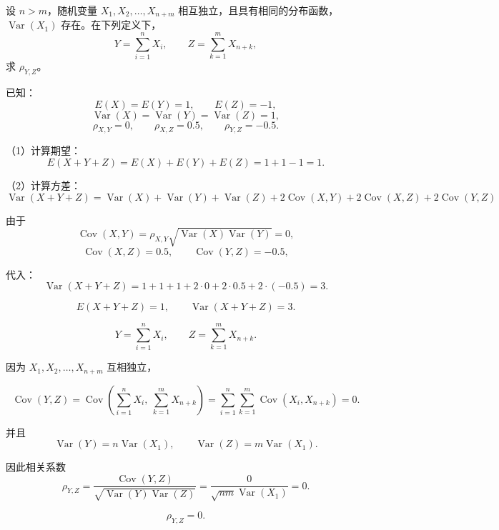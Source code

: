\begin{homework}[3.34]
设 $n > m$，随机变量 $X_1, X_2, \dots, X_{n+m}$ 相互独立，且具有相同的分布函数，$\operatorname{Var}(X_1)$ 存在。在下列定义下，
\[
Y = \sum_{i=1}^n X_i,\qquad Z = \sum_{k=1}^m X_{n+k},
\]
求 $\rho_{Y,Z}$。
\end{homework}
\begin{solution}
已知：
\[
E(X)=E(Y)=1,\qquad E(Z)=-1,
\]
\[
\operatorname{Var}(X)=\operatorname{Var}(Y)=\operatorname{Var}(Z)=1,
\]
\[
\rho_{X,Y}=0,\qquad \rho_{X,Z}=0.5,\qquad \rho_{Y,Z}=-0.5.
\]

（1）计算期望：
\[
E(X+Y+Z)=E(X)+E(Y)+E(Z)=1+1-1=1.
\]

（2）计算方差：
\[
\operatorname{Var}(X+Y+Z)
=\operatorname{Var}(X)+\operatorname{Var}(Y)+\operatorname{Var}(Z)
+2\operatorname{Cov}(X,Y)+2\operatorname{Cov}(X,Z)+2\operatorname{Cov}(Y,Z)
\]

由于
\[
\operatorname{Cov}(X,Y)=\rho_{X,Y}\sqrt{\operatorname{Var}(X)\operatorname{Var}(Y)}=0,
\]
\[
\operatorname{Cov}(X,Z)=0.5,\qquad
\operatorname{Cov}(Y,Z)=-0.5,
\]

代入：
\[
\operatorname{Var}(X+Y+Z)=1+1+1+2\cdot 0+2\cdot 0.5+2\cdot (-0.5)=3.
\]

\[
\boxed{E(X+Y+Z)=1,\qquad \operatorname{Var}(X+Y+Z)=3.}
\]
\end{solution}
\begin{solution}
\[
Y=\sum_{i=1}^{n} X_i,\qquad Z=\sum_{k=1}^{m} X_{n+k}.
\]

因为 $X_1,X_2,\dots,X_{n+m}$ 互相独立，

\[
\operatorname{Cov}(Y,Z)
=\operatorname{Cov}\left(\sum_{i=1}^{n}X_i,\ \sum_{k=1}^{m}X_{n+k}\right)
=\sum_{i=1}^{n}\sum_{k=1}^{m}\operatorname{Cov}(X_i,X_{n+k})=0.
\]

并且
\[
\operatorname{Var}(Y)=n\operatorname{Var}(X_1), \qquad
\operatorname{Var}(Z)=m\operatorname{Var}(X_1).
\]

因此相关系数
\[
\rho_{Y,Z}=
\frac{\operatorname{Cov}(Y,Z)}{\sqrt{\operatorname{Var}(Y)\operatorname{Var}(Z)}}=
\frac{0}{\sqrt{nm}\operatorname{Var}(X_1)}=0.
\]

\[
\boxed{\rho_{Y,Z}=0.}
\]
\end{solution}
